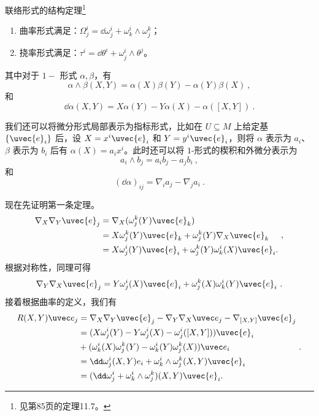 \begin{theorem}{联络形式的结构定理\footnote{见\cite{GTM275}第85页的定理11.7。}}\label{the_ConFom_2}
\begin{enumerate}
\item 曲率形式满足：$\Omega^i_j=\dd \omega^i_j+\omega^i_k\wedge\omega^k_j$；
\item 挠率形式满足：$\tau^i=\dd\theta^i+\omega^i_j\wedge\theta^j$。
\end{enumerate}

其中对于 $1-$ 形式 $\alpha, \beta$，有
\begin{equation}
\alpha\wedge \beta(X, Y)=\alpha(X)\beta(Y)-\alpha(Y)\beta(X)~,
\end{equation}
和
\begin{equation}
\dd \alpha(X, Y)=X\alpha(Y)-Y\alpha(X)-\alpha([X, Y])~.
\end{equation}

我们还可以将微分形式局部表示为指标形式，比如在 $U\subseteq M$ 上给定基 $\{\uvec{e}_i\}$ 后，设 $X=x^i\uvec{e}_i$ 和 $Y=y^i\uvec{e}_i$，则将 $\alpha$ 表示为 $a_i$、$\beta$ 表示为 $b_i$ 后有 $\alpha(X)=a_ix^i$。此时还可以将 $1$-形式的楔积和外微分表示为
\begin{equation}
a_i\wedge b_j=a_ib_j-a_jb_i~,
\end{equation}
和
\begin{equation}
(\dd \alpha)_{ij}=\nabla_{i}a_j-\nabla_{j}a_i~.
\end{equation}
\end{theorem}


现在先证明第一条定理。
\begin{equation}
\begin{aligned}
\nabla_X\nabla_Y\uvec{e}_j& =\nabla_X(\omega_j^k(Y)\uvec{e}_k) \\
&=X\omega_j^k(Y)\uvec{e}_k+\omega_j^k(Y)\nabla_X\uvec{e}_k \\
&=X\omega_j^i(Y)\uvec{e}_i+\omega_j^k(Y)\omega_k^i(X)\uvec{e}_i.
\end{aligned}~,
\end{equation}
根据对称性，同理可得
\begin{equation}
\nabla_Y\nabla_X\uvec{e}_j =Y\omega_j^i(X)\uvec{e}_i+\omega_j^k(X)\omega_k^i(Y)\uvec{e}_i~.
\end{equation}
接着根据曲率的定义，我们有
\begin{equation}
\begin{aligned}
R(X,Y)\uvec e_j& =\nabla_X\nabla_Y\uvec{e}_j-\nabla_Y\nabla_X\uvec e_j-\nabla_{[X,Y]}\uvec{e}_j \\
&=(X\omega_j^i(Y)-Y\omega_j^i(X)-\omega_j^i([X,Y]))\uvec{e}_i \\
&+(\omega_k^i(X)\omega_j^k(Y)-\omega_k^i(Y)\omega_j^k(X))\uvec e_i \\
&=\dd\omega_j^i(X,Y)e_i+\omega_k^i\wedge\omega_j^k(X,Y)\uvec{e}_i \\
&=(\dd\omega_j^i+\omega_k^i\wedge\omega_j^k)(X,Y)\uvec{e}_i.
\end{aligned}~.
\end{equation}



